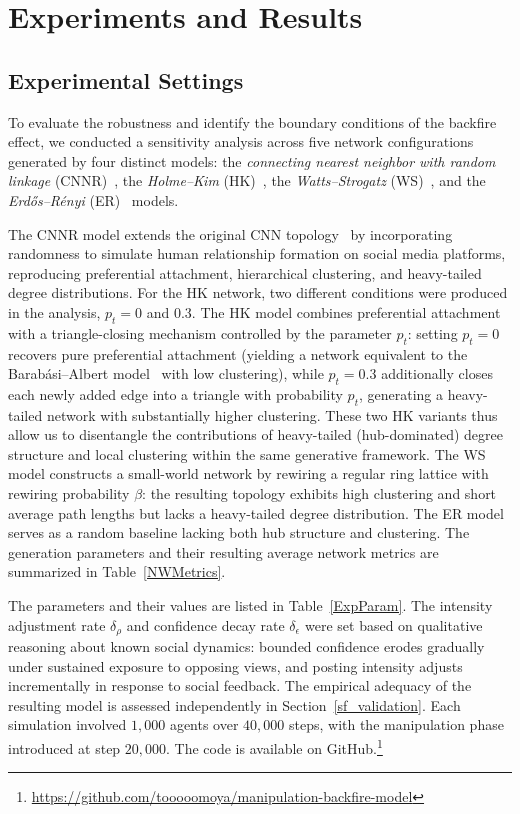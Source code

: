 \documentclass[pdflatex,sn-mathphys-num]{sn-jnl}%
\theoremstyle{thmstyleone}%
\theoremstyle{thmstyletwo}%
\theoremstyle{thmstylethree}%
\def\Dgreen{\color[rgb]{0.02,0.55,0.04}}
\def\post{\rho} %
\def\BoundedConfidence{\epsilon}
\begin{document}
\section{Experiments and Results}
\subsection{Experimental Settings} 
\Dgreen
To evaluate the robustness and identify the boundary conditions of the backfire effect, we conducted a sensitivity analysis across five network configurations generated by four distinct models: the \emph{connecting nearest neighbor with random linkage} (CNNR)~\cite{Yuta2007}, the \emph{Holme--Kim} (HK)~\cite{Holme2002}, the \emph{Watts--Strogatz} (WS)~\cite{Watts1998}, and the \emph{Erd\H{o}s--R\'{e}nyi} (ER)~\cite{Erdos1959} models.

The CNNR model extends the original CNN topology~\cite{Vazquez2003} by incorporating randomness to simulate human relationship formation on social media platforms, reproducing preferential attachment, hierarchical clustering, and heavy-tailed degree distributions.
For the HK network, two different conditions were produced in the analysis, $p_t = 0$ and $0.3$.
The HK model combines preferential attachment with a triangle-closing mechanism controlled by the parameter $p_t$: setting $p_t = 0$ recovers pure preferential attachment (yielding a network equivalent to the Barab\'{a}si--Albert model~\cite{Barabasi1999} with low clustering), while $p_t = 0.3$ additionally closes each newly added edge into a triangle with probability $p_t$, generating a heavy-tailed network with substantially higher clustering. These two HK variants thus allow us to disentangle the contributions of heavy-tailed (hub-dominated) degree structure and local clustering within the same generative framework. The WS model constructs a small-world network by rewiring a regular ring lattice with rewiring probability $\beta$: the resulting topology exhibits high clustering and short average path lengths but lacks a heavy-tailed degree distribution. The ER model serves as a random baseline lacking both hub structure and clustering. The generation parameters and their resulting average network metrics are summarized in Table~\ref{NWMetrics}.
\par


The parameters and their values are listed in Table~\ref{ExpParam}.
The intensity adjustment rate $\delta_{\post}$ and confidence decay rate $\delta_{\BoundedConfidence}$ were set based on qualitative reasoning about known social dynamics: bounded confidence erodes gradually under sustained exposure to opposing views, and posting intensity adjusts incrementally in response to social feedback. The empirical adequacy of the resulting model is assessed independently in Section~\ref{sf_validation}.
Each simulation involved $1{,}000$ agents over $40{,}000$ steps, with the manipulation phase introduced at step $20{,}000$. The code is available on GitHub.\footnote{\url{https://github.com/tooooomoya/manipulation-backfire-model}}
\par
\end{document}
